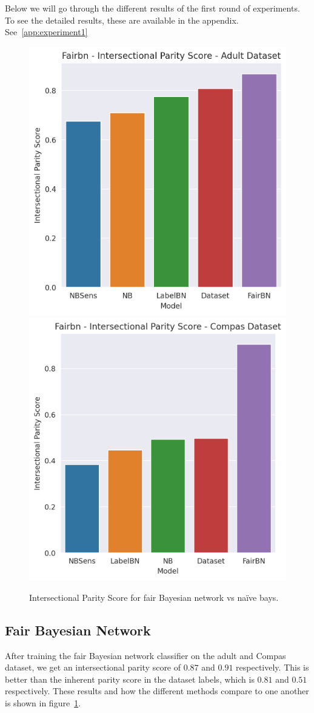 Below we will go through the different results of the first round of experiments. To see the detailed results, these are available in the appendix. See~\ref{app:experiment1}

\begin{figure}
    \centering
    \includegraphics[width=0.49\linewidth]{figures/adult_fairbn_parity.png}
    \includegraphics[width=0.49\linewidth]{figures/compas_fairbn_parity.png}
    \caption{Intersectional Parity Score for fair Bayesian network vs naïve bays.}
    \label{fig:exp1fairBNparity}
\end{figure}

\subsection{Fair Bayesian Network}

After training the fair Bayesian network classifier on the adult and Compas dataset, we get an intersectional parity score of $0.87$ and $0.91$ respectively. This is better than the inherent parity score in the dataset labels, which is $0.81$ and $0.51$ respectively. These results and how the different methods compare to one another is shown in figure~\ref{fig:exp1fairBNparity}.

